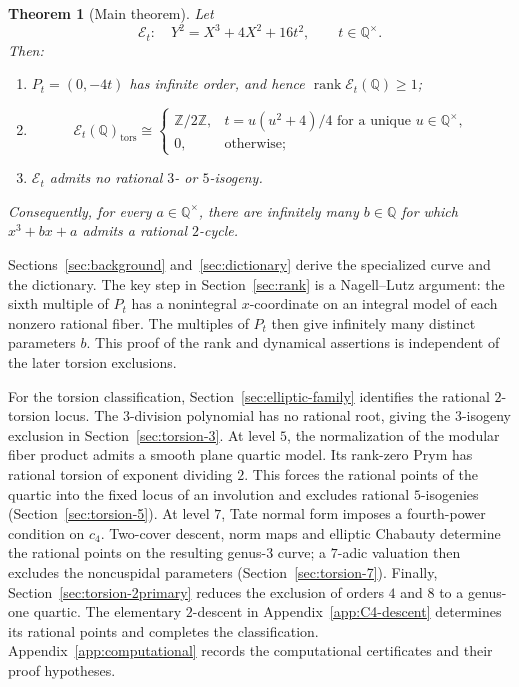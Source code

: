 \documentclass[11pt,a4paper]{amsart}
\newtheorem{theorem}{Theorem}[section]
\theoremstyle{definition}
\theoremstyle{remark}
\numberwithin{equation}{section}
\newcommand{\Q}{\mathbb{Q}}
\newcommand{\Z}{\mathbb{Z}}
\newcommand{\mathcalE}{\mathcal{E}}
\newcommand{\rank}{\operatorname{rank}}
\begin{document}
\begin{theorem}[Main theorem]\label{thm:main-family}
Let
\[
\mathcalE_t:\quad Y^2=X^3+4X^2+16t^2,
\qquad t\in\Q^\times.
\]
Then:
\begin{enumerate}[label=\textup{(\roman*)},leftmargin=*]
\item \(P_t=(0,-4t)\) has infinite order, and hence
      \(\rank\mathcalE_t(\Q)\geq1\);
\item
\[
\mathcalE_t(\Q)_{\mathrm{tors}}\cong
\begin{cases}
\Z/2\Z,&t=u(u^2+4)/4\text{ for a unique }u\in\Q^\times,\\
0,&\text{otherwise};
\end{cases}
\]
\item \(\mathcalE_t\) admits no rational \(3\)- or \(5\)-isogeny.
\end{enumerate}
Consequently, for every \(a\in\Q^\times\), there are infinitely many
\(b\in\Q\) for which \(x^3+bx+a\) admits a rational \(2\)-cycle.
\end{theorem}

Sections~\ref{sec:background} and~\ref{sec:dictionary} derive the
specialized curve and the dictionary. The key step in
Section~\ref{sec:rank} is a Nagell--Lutz argument: the sixth multiple
of $P_t$ has a nonintegral $x$-coordinate on an integral model of each
nonzero rational fiber. The multiples of $P_t$ then give infinitely many distinct
parameters $b$. This proof of the rank and dynamical assertions is
independent of the later torsion exclusions.

For the torsion classification, Section~\ref{sec:elliptic-family}
identifies the rational $2$-torsion locus. The $3$-division polynomial
has no rational root, giving the $3$-isogeny exclusion in
Section~\ref{sec:torsion-3}. At level $5$, the normalization of the
modular fiber product admits a smooth plane quartic model. Its rank-zero
Prym has rational torsion of exponent dividing $2$. This forces the
rational points of the quartic into the fixed locus of
an involution and excludes rational $5$-isogenies
(Section~\ref{sec:torsion-5}). At level $7$, Tate normal form imposes a
fourth-power condition on $c_4$. Two-cover descent, norm maps and
elliptic Chabauty determine the rational points on the resulting genus-$3$
curve; a $7$-adic valuation then excludes the noncuspidal parameters
(Section~\ref{sec:torsion-7}). Finally, Section~\ref{sec:torsion-2primary} reduces the exclusion of
orders $4$ and $8$ to a genus-one quartic. The elementary $2$-descent in
Appendix~\ref{app:C4-descent} determines its rational points and completes
the classification. Appendix~\ref{app:computational} records the
computational certificates and their proof hypotheses.
\end{document}
